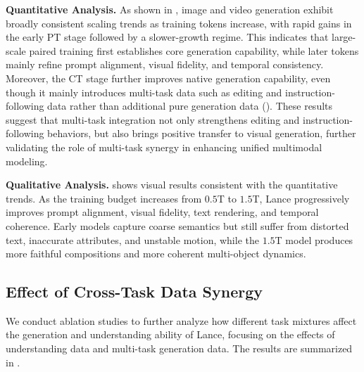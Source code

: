 \documentclass{llmxive}
\begin{document}
\textbf{Quantitative Analysis.}
As shown in , image and video generation exhibit broadly consistent scaling trends as training tokens increase, with rapid gains in the early PT stage followed by a slower-growth regime. This indicates that large-scale paired training first establishes core generation capability, while later tokens mainly refine prompt alignment, visual fidelity, and temporal consistency.
Moreover, the CT stage further improves native generation capability, even though it mainly introduces multi-task data such as editing and instruction-following data rather than additional pure generation data (). These results suggest that multi-task integration not only strengthens editing and instruction-following behaviors, but also brings positive transfer to visual generation, further validating the role of multi-task synergy in enhancing unified multimodal modeling.


\textbf{Qualitative Analysis.}
 shows visual results consistent with the quantitative trends. As the training budget increases from $0.5$T to $1.5$T, Lance progressively improves prompt alignment, visual fidelity, text rendering, and temporal coherence. Early models capture coarse semantics but still suffer from distorted text, inaccurate attributes, and unstable motion, while the $1.5$T model produces more faithful compositions and more coherent multi-object dynamics. 




\subsection{Effect of Cross-Task Data Synergy}

We conduct ablation studies to further analyze how different task mixtures affect the generation and understanding ability of Lance, focusing on the effects of understanding data and multi-task generation data. 
The results are summarized in .
\end{document}

